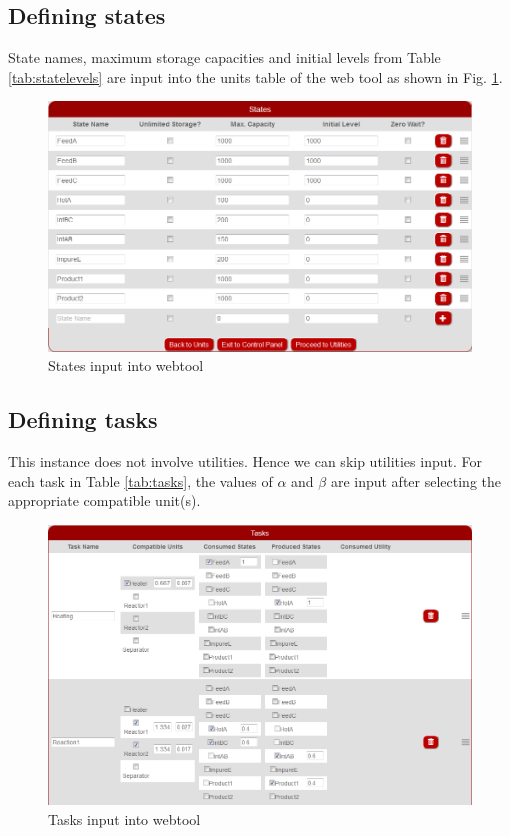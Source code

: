 \subsection{Defining states}

State names, maximum storage capacities and initial levels from Table \ref{tab:statelevels} are input into the units table of the web tool as shown in Fig. \ref{fig:defStates}.

\begin{figure}[htbp]
\centering
\includegraphics[width=\linewidth]{Images/DefineStates.png}
\caption{States input into webtool}
\label{fig:defStates}
\end{figure}

\subsection{Defining tasks}

This instance does not involve utilities. Hence we can skip utilities input. For each task in Table \ref{tab:tasks}, the values of $\alpha$ and $\beta$ are input after selecting the appropriate compatible unit(s). 

\begin{figure}[htbp]
\centering
\includegraphics[width=\linewidth]{Images/DefineTasks.png}
\caption{Tasks input into webtool}
\label{fig:defTasks}
\end{figure}